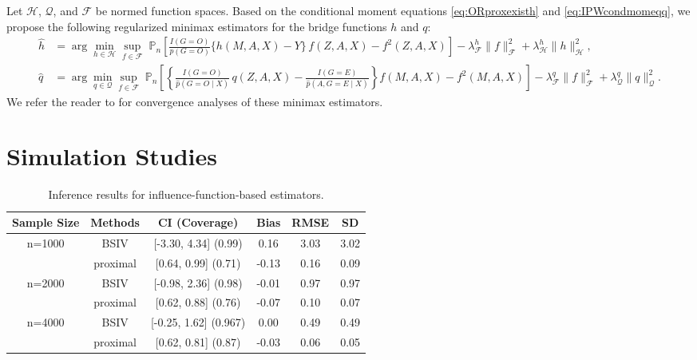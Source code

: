 \documentclass[10pt]{article}
\begin{document}
Let \(\mathcal{H}\), \(\mathcal{Q}\), and \(\mathcal{F}\) be normed function spaces. Based on the conditional moment equations \eqref{eq:ORproxexisth} and \eqref{eq:IPWcondmomeqq}, we propose the following regularized minimax estimators for the bridge functions \(h\) and \(q\):
{\small
\begin{align*}
\hat{h}
&= \arg\min_{h\in\mathcal{H}}\sup_{f\in\mathcal{F}}\;
\mathbb{P}_n\!\left[ \frac{I(G=O)}{p(G=O)}\{h(M,A,X)-Y\}\,f(Z,A,X) - f^2(Z,A,X) \right]
- \lambda^{h}_{\mathcal{F}}\|f\|_{\mathcal{F}}^{2} + \lambda^{h}_{\mathcal{H}}\|h\|_{\mathcal{H}}^{2},\\[4pt]
\hat{q}
&=\! \arg\min_{q\in\mathcal{Q}}\sup_{f\in\mathcal{F}}\;
\mathbb{P}_n\!\left[\! \left\{\!\frac{I(G=O)}{\hat{p}(G=O\!\mid \!X)}\,q(Z,A,X)
\!- \!\frac{I(G=E)}{\hat{p}(A,G=E\!\mid \!X)}\!\right\} f(M,A,X) \!-\! f^2(M,A,X) \right]
\!-\! \lambda^{q}_{\mathcal{F}}\|f\|_{\mathcal{F}}^{2} \!+\! \lambda^{q}_{\mathcal{Q}}\|q\|_{\mathcal{Q}}^{2}.
\end{align*}
}
We refer the reader to \citep{dikkala2020minimax,ghassami2022minimax} for convergence analyses of these minimax estimators.



\section{Simulation Studies}
\label{sec:simulation}

\begin{table}[t]
\centering
\begin{tabular}{c | c c c c c} 
 \hline
 Sample Size & Methods & CI (Coverage) & Bias & RMSE & SD   \\ [0.5ex] 
 \hline
n=1000 & BSIV & [-3.30, 4.34] (0.99)  & 0.16 & 3.03  & 3.02  \\
 & proximal & [0.64, 0.99] (0.71) & -0.13 & 0.16 & 0.09 \\
\hline
n=2000 & BSIV & [-0.98, 2.36] (0.98)  & -0.01 & 0.97  & 0.97 \\
 & proximal & [0.62, 0.88] (0.76) & -0.07 & 0.10 & 0.07 \\
 \hline
 n=4000 & BSIV & [-0.25, 1.62] (0.967)  & 0.00  & 0.49  & 0.49 \\
& proximal & [0.62, 0.81] (0.87) & -0.03 & 0.06 & 0.05 \\
 \hline
\end{tabular}
\caption{Inference results for influence-function-based estimators.}
\label{inference_table}
\end{table}
\end{document}
